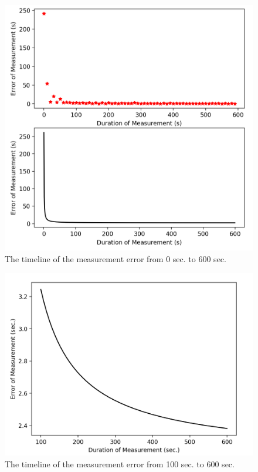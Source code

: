 \documentclass[12pt, a4paper]{report}
\begin{document}
      \begin{figure}[H]
        \centering
        \includegraphics[scale=0.6]{Images/error_measurement}
        
        \caption{The timeline of the measurement error from 0 sec. to 600 sec.}
        \end{figure}

      \begin{figure}[H]
        \centering
        \includegraphics[scale=0.6]{Images/error_measurement_100_600}
        
        \caption{The timeline of the measurement error from 100 sec. to 600 sec.}
        \end{figure}
\end{document}
